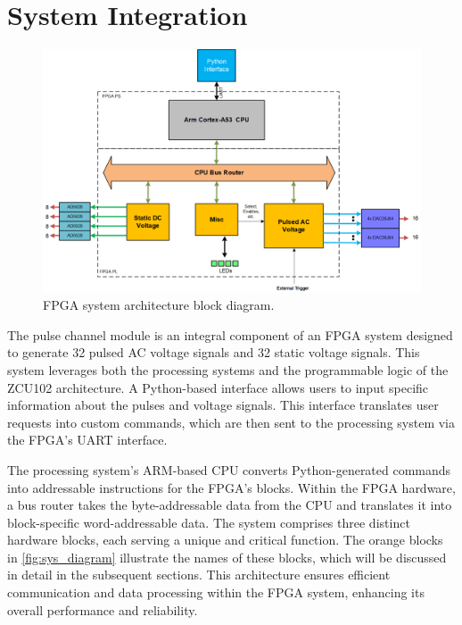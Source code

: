 \chapter{System Integration}


\begin{figure}[h]
    \centering
    \includegraphics[width=1\linewidth]{figures/5.1.png}
    \caption{FPGA system architecture block diagram.}
    \label{fig:sys_diagram}
\end{figure}

The pulse channel module is an integral component of an FPGA system designed to generate 32 pulsed AC voltage signals and 32 static voltage signals. This system leverages both the processing systems and the programmable logic of the ZCU102 architecture. A Python-based interface allows users to input specific information about the pulses and voltage signals. This interface translates user requests into custom commands, which are then sent to the processing system via the FPGA's UART interface.

The processing system's ARM-based CPU converts Python-generated commands into addressable instructions for the FPGA's blocks. Within the FPGA hardware, a bus router takes the byte-addressable data from the CPU and translates it into block-specific word-addressable data. The system comprises three distinct hardware blocks, each serving a unique and critical function. The orange blocks in \autoref{fig:sys_diagram} illustrate the names of these blocks, which will be discussed in detail in the subsequent sections. This architecture ensures efficient communication and data processing within the FPGA system, enhancing its overall performance and reliability.

